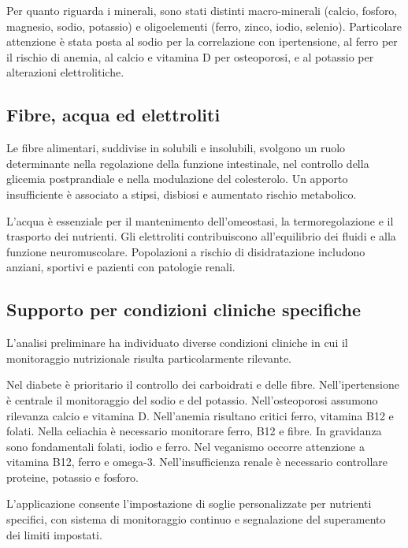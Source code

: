 \documentclass[a4paper,12pt]{article}
\begin{document}
    Per quanto riguarda i minerali, sono stati distinti macro-minerali (calcio, fosforo, magnesio, sodio, potassio) e oligoelementi (ferro, zinco, iodio, selenio).
    Particolare attenzione è stata posta al sodio per la correlazione con ipertensione, al ferro per il rischio di anemia, al calcio e vitamina D per osteoporosi, e al potassio per alterazioni elettrolitiche.

    \subsection{Fibre, acqua ed elettroliti}

    Le fibre alimentari, suddivise in solubili e insolubili, svolgono un ruolo determinante nella regolazione della funzione intestinale, nel controllo della glicemia postprandiale e nella modulazione del colesterolo. Un apporto insufficiente è associato a stipsi, disbiosi e aumentato rischio metabolico.

    L’acqua è essenziale per il mantenimento dell’omeostasi, la termoregolazione e il trasporto dei nutrienti. Gli elettroliti contribuiscono all’equilibrio dei fluidi e alla funzione neuromuscolare. Popolazioni a rischio di disidratazione includono anziani, sportivi e pazienti con patologie renali.

    \subsection{Supporto per condizioni cliniche specifiche}

    L’analisi preliminare ha individuato diverse condizioni cliniche in cui il monitoraggio nutrizionale risulta particolarmente rilevante.

    Nel diabete è prioritario il controllo dei carboidrati e delle fibre.
    Nell’ipertensione è centrale il monitoraggio del sodio e del potassio.
    Nell’osteoporosi assumono rilevanza calcio e vitamina D.
    Nell’anemia risultano critici ferro, vitamina B12 e folati.
    Nella celiachia è necessario monitorare ferro, B12 e fibre.
    In gravidanza sono fondamentali folati, iodio e ferro.
    Nel veganismo occorre attenzione a vitamina B12, ferro e omega-3.
    Nell’insufficienza renale è necessario controllare proteine, potassio e fosforo.

    L’applicazione consente l’impostazione di soglie personalizzate per nutrienti specifici, con sistema di monitoraggio continuo e segnalazione del superamento dei limiti impostati.
\end{document}
